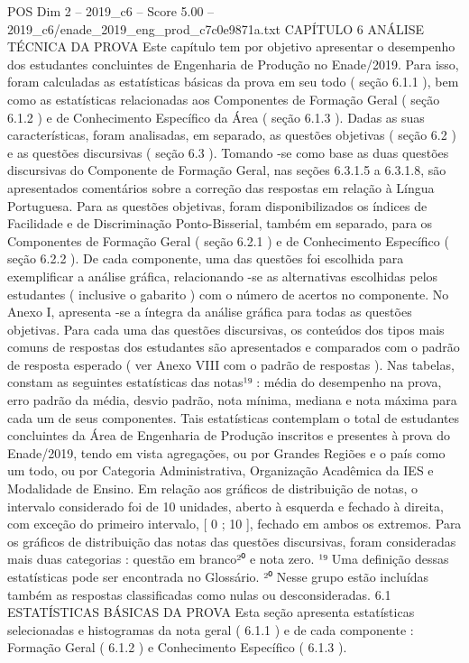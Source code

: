 \begin{textsample}{POS Dim 2 – 2019\_c6 – Score 5.00 – 2019\_c6/enade\_2019\_eng\_prod\_c7c0e9871a.txt}  \label{ex:f2_pos_152}
CAPÍTULO 6 ANÁLISE TÉCNICA DA PROVA Este capítulo tem por objetivo apresentar o desempenho dos estudantes concluintes de Engenharia de Produção no Enade/2019.
Para isso, foram calculadas as estatísticas básicas da prova em seu todo ( seção 6.1.1 ), bem como as estatísticas relacionadas aos Componentes de Formação Geral ( seção 6.1.2 ) e de Conhecimento Específico da Área ( seção 6.1.3 ).
Dadas as suas características, foram analisadas, em separado, as questões objetivas ( seção 6.2 ) e as questões discursivas ( seção 6.3 ).
Tomando -se como base as duas questões discursivas do Componente de Formação Geral, nas seções 6.3.1.5 a 6.3.1.8, são apresentados comentários sobre a correção das respostas em relação à Língua Portuguesa.
Para as questões objetivas, foram disponibilizados os índices de Facilidade e de Discriminação Ponto-Bisserial, também em separado, para os Componentes de Formação Geral ( seção 6.2.1 ) e de Conhecimento Específico ( seção 6.2.2 ).
De cada componente, uma das questões foi escolhida para exemplificar a análise gráfica, relacionando -se as alternativas escolhidas pelos estudantes ( inclusive o gabarito ) com o número de acertos no componente.
No Anexo I, apresenta -se a íntegra da análise gráfica para todas as questões objetivas.
Para cada uma das questões discursivas, os conteúdos dos tipos mais comuns de respostas dos estudantes são apresentados e comparados com o padrão de resposta esperado ( ver Anexo VIII com o padrão de respostas ).
Nas tabelas, constam as seguintes estatísticas das notas¹⁹ : média do desempenho na prova, erro padrão da média, desvio padrão, nota mínima, mediana e nota máxima para cada um de seus componentes.
Tais estatísticas contemplam o total de estudantes concluintes da Área de Engenharia de Produção inscritos e presentes à prova do Enade/2019, tendo em vista agregações, ou por Grandes Regiões e o país como um todo, ou por Categoria Administrativa, Organização Acadêmica da IES e Modalidade de Ensino.
Em relação aos gráficos de distribuição de notas, o intervalo considerado foi de 10 unidades, aberto à esquerda e fechado à direita, com exceção do primeiro intervalo, [ 0 ; 10 ], fechado em ambos os extremos.
Para os gráficos de distribuição das notas das questões discursivas, foram consideradas mais duas categorias : questão em branco²⁰ e nota zero. ¹⁹ Uma definição dessas estatísticas pode ser encontrada no Glossário. ²⁰ Nesse grupo estão incluídas também as respostas classificadas como nulas ou desconsideradas. 6.1 ESTATÍSTICAS BÁSICAS DA PROVA Esta seção apresenta estatísticas selecionadas e histogramas da nota geral ( 6.1.1 ) e de cada componente : Formação Geral ( 6.1.2 ) e Conhecimento Específico ( 6.1.3 ).

\end{textsample}
